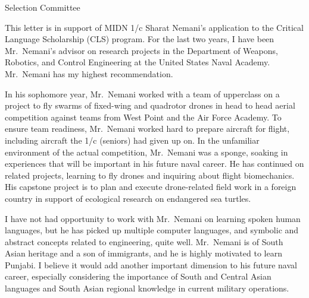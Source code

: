 \documentclass[12pt]{wrceletter}
\date{\today}
\begin{document}
\begin{letter}{%
Selection Committee}

\opening{}
\raggedright 
\setlength{\parindent}{15pt}

This letter is in support of MIDN 1/c Sharat Nemani’s application to the Critical Language Scholarship (CLS) program. For the last two years, I have been Mr.~Nemani’s advisor on research projects in the Department of Weapons, Robotics, and Control Engineering at the United States Naval Academy. Mr.~Nemani has my highest recommendation.
 
In his sophomore year, Mr.~Nemani worked with a team of upperclass on a project to fly swarms of fixed-wing and quadrotor drones in head to head aerial competition against teams from West Point and the Air Force Academy. To ensure team readiness, Mr.~Nemani worked hard to prepare aircraft for flight, including aircraft the 1/c (seniors) had given up on. In the unfamiliar environment of the actual competition, Mr.~Nemani was a sponge, soaking in experiences that will be important in his future naval career. He has continued on related projects, learning to fly drones and inquiring about flight biomechanics. His capstone project is to plan and execute drone-related field work in a foreign country in support of ecological research on endangered sea turtles.
 
I have not had opportunity to work with Mr.~Nemani on learning spoken human languages, but he has picked up multiple computer languages, and symbolic and abstract concepts related to engineering, quite well. Mr.~Nemani is of South Asian heritage and a son of immigrants, and he is highly motivated to learn Punjabi. I believe it would add another important dimension to his future naval career, especially considering the importance of South and Central Asian languages and South Asian regional knowledge in current military operations.

\closing{~} %

\end{letter}
\end{document}
